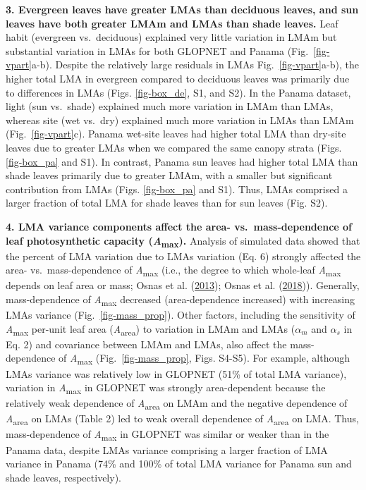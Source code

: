 \documentclass[
  12pt,
  letterpaper,
  DIV=11,
  numbers=noendperiod]{scrartcl}
\begin{document}
\textbf{3. Evergreen leaves have greater LMAs than deciduous leaves, and
sun leaves have both greater LMAm and LMAs than shade leaves.} Leaf
habit (evergreen vs.~deciduous) explained very little variation in LMAm
but substantial variation in LMAs for both GLOPNET and Panama
(Fig.~\ref{fig-vpart}a-b). Despite the relatively large residuals in
LMAs Fig.~\ref{fig-vpart}a-b), the higher total LMA in evergreen
compared to deciduous leaves was primarily due to differences in LMAs
(Figs. \ref{fig-box_de}, S1, and S2). In the Panama dataset, light (sun
vs.~shade) explained much more variation in LMAm than LMAs, whereas site
(wet vs.~dry) explained much more variation in LMAs than LMAm
(Fig.~\ref{fig-vpart}c). Panama wet-site leaves had higher total LMA
than dry-site leaves due to greater LMAs when we compared the same
canopy strata (Figs. \ref{fig-box_pa} and S1). In contrast, Panama sun
leaves had higher total LMA than shade leaves primarily due to greater
LMAm, with a smaller but significant contribution from LMAs (Figs.
\ref{fig-box_pa} and S1). Thus, LMAs comprised a larger fraction of
total LMA for shade leaves than for sun leaves (Fig. S2).

\textbf{4. LMA variance components affect the area- vs.~mass-dependence
of leaf photosynthetic capacity (\emph{A}\textsubscript{max}).} Analysis
of simulated data showed that the percent of LMA variation due to LMAs
variation (Eq. 6) strongly affected the area- vs.~mass-dependence of
\emph{A}\textsubscript{max} (i.e., the degree to which whole-leaf
\emph{A}\textsubscript{max} depends on leaf area or mass; Osnas et al.
(\protect\hyperlink{ref-Osnas2013}{2013}); Osnas et al.
(\protect\hyperlink{ref-Osnas2018}{2018})). Generally, mass-dependence
of \emph{A}\textsubscript{max} decreased (area-dependence increased)
with increasing LMAs variance (Fig.~\ref{fig-mass_prop}). Other factors,
including the sensitivity of \emph{A}\textsubscript{max} per-unit leaf
area (\emph{A}\textsubscript{area}) to variation in LMAm and LMAs
(\(\alpha_m\) and \(\alpha_s\) in Eq. 2) and covariance between LMAm and
LMAs, also affect the mass-dependence of \emph{A}\textsubscript{max}
(Fig.~\ref{fig-mass_prop}, Figs. S4-S5). For example, although LMAs
variance was relatively low in GLOPNET (51\% of total LMA variance),
variation in \emph{A}\textsubscript{max} in GLOPNET was strongly
area-dependent because the relatively weak dependence of
\emph{A}\textsubscript{area} on LMAm and the negative dependence of
\emph{A}\textsubscript{area} on LMAs (Table 2) led to weak overall
dependence of \emph{A}\textsubscript{area} on LMA. Thus, mass-dependence
of \emph{A}\textsubscript{max} in GLOPNET was similar or weaker than in
the Panama data, despite LMAs variance comprising a larger fraction of
LMA variance in Panama (74\% and 100\% of total LMA variance for Panama
sun and shade leaves, respectively).
\end{document}
